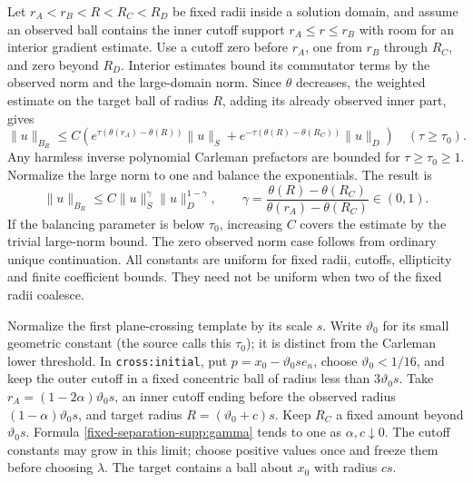\documentclass[11pt]{article}
\theoremstyle{definition}
\theoremstyle{remark}
\numberwithin{equation}{section}
\begin{document}
Let $r_A<r_B<R<R_C<R_D$ be fixed radii inside a solution domain,
and assume an observed ball contains the inner cutoff support
$r_A\le r\le r_B$ with room for an interior gradient estimate.
Use a cutoff zero before $r_A$, one from $r_B$ through $R_C$, and
zero beyond $R_D$. Interior estimates bound its commutator terms by
the observed norm and the large-domain norm. Since $\theta$ decreases,
the weighted estimate on the target ball of radius $R$, adding its
already observed inner part, gives
\begin{equation}\label{fixed-separation-supp:radial-balance}
 \|u\|_{B_R}\le C\left(
 e^{\tau(\theta(r_A)-\theta(R))}\|u\|_S
 +e^{-\tau(\theta(R)-\theta(R_C))}\|u\|_D\right)
 \quad(\tau\ge\tau_0).
\end{equation}
Any harmless inverse polynomial Carleman prefactors are bounded for
$\tau\ge\tau_0\ge1$. Normalize the large norm to one and balance
the exponentials. The result is
\begin{equation}\label{fixed-separation-supp:gamma}
 \|u\|_{B_R}\le C\|u\|_S^\gamma\|u\|_D^{1-\gamma},
 \qquad
 \gamma=\frac{\theta(R)-\theta(R_C)}
 {\theta(r_A)-\theta(R_C)}\in(0,1).
\end{equation}
If the balancing parameter is below $\tau_0$, increasing $C$ covers
the estimate by the trivial large-norm bound. The zero observed norm
case follows from ordinary unique continuation. All constants are
uniform for fixed radii, cutoffs, ellipticity and finite coefficient
bounds. They need not be uniform when two of the fixed radii coalesce.

Normalize the first plane-crossing template by its scale $s$. Write $\vartheta_0$ for its small geometric constant (the source calls this $\tau_0$); it is distinct from the Carleman lower threshold. In
\texttt{cross:initial}, put $p=x_0-\vartheta_0s e_n$, choose
$\vartheta_0<1/16$, and keep the outer cutoff in a fixed concentric ball
of radius less than $3\vartheta_0s$. Take
$r_A=(1-2\alpha)\vartheta_0s$, an inner cutoff ending before the observed
radius $(1-\alpha)\vartheta_0s$, and target radius
$R=(\vartheta_0+c)s$. Keep $R_C$ a fixed amount beyond $\vartheta_0s$.
Formula \eqref{fixed-separation-supp:gamma} tends to one as
$\alpha,c\downarrow0$. The cutoff constants may grow in this limit;
choose positive values once and freeze them before choosing $\lambda$.
The target contains a ball about $x_0$ with radius $cs$.
\end{document}
